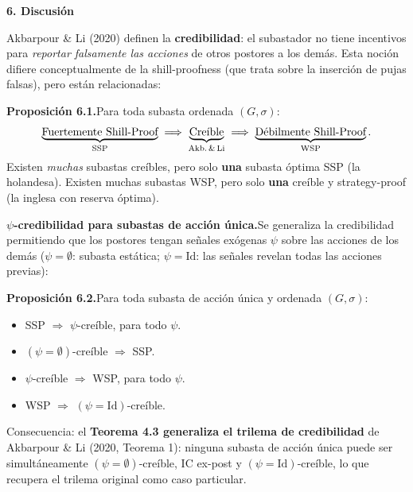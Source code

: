\documentclass[20pt]{extarticle}
\renewcommand{\small}{\fontsize{20}{25}\selectfont}
\renewcommand{\footnotesize}{\fontsize{18}{22}\selectfont}
\newcommand{\stit}[1]{{\fontsize{38}{46}\selectfont\color{ink}\textbf{#1}}}
\begin{document}
\begin{minipage}[t]{35cm}


  \stit{6. Discusión}

  \vspace{6mm}
  {\small\justifying Akbarpour \& Li (2020) definen la \textbf{credibilidad}: el subastador no tiene incentivos para \emph{reportar falsamente las acciones} de otros postores a los demás. Esta noción difiere conceptualmente de la shill-proofness (que trata sobre la inserción de pujas falsas), pero están relacionadas:}

  \vspace{6mm}
  \begin{tcolorbox}[sidebar]
    \footnotesize\textbf{Proposición 6.1.}\enspace Para toda subasta ordenada $(G,\sigma)$:
    \[
      \underbrace{\text{Fuertemente Shill-Proof}}_{\text{SSP}} \;\Longrightarrow\; \underbrace{\text{Creíble}}_{\text{Akb.\,\&\,Li}} \;\Longrightarrow\; \underbrace{\text{Débilmente Shill-Proof}}_{\text{WSP}}.
    \]
    \smallskip Existen \emph{muchas} subastas creíbles, pero solo \textbf{una} subasta óptima SSP (la holandesa). Existen muchas subastas WSP, pero solo \textbf{una} creíble y strategy-proof (la inglesa con reserva óptima).
  \end{tcolorbox}

  \vspace{6mm}
  {\small\justifying\textbf{$\psi$-credibilidad para subastas de acción única.}\enspace Se generaliza la credibilidad permitiendo que los postores tengan señales exógenas $\psi$ sobre las acciones de los demás ($\psi{=}\emptyset$: subasta estática; $\psi{=}\mathrm{Id}$: las señales revelan todas las acciones previas):}

  \vspace{5mm}
  \begin{tcolorbox}[shaded]
    \footnotesize\textbf{Proposición 6.2.}\enspace Para toda subasta de acción única y ordenada $(G,\sigma)$:
    \begin{itemize}
      \item SSP $\Rightarrow$ $\psi$-creíble, para todo $\psi$.
      \item $(\psi{=}\emptyset)$-creíble $\Rightarrow$ SSP.
      \item $\psi$-creíble $\Rightarrow$ WSP, para todo $\psi$.
      \item WSP $\Rightarrow$ $(\psi{=}\mathrm{Id})$-creíble.
    \end{itemize}
    \smallskip Consecuencia: el \textbf{Teorema 4.3 generaliza el trilema de credibilidad} de Akbarpour \& Li (2020, Teorema 1): ninguna subasta de acción única puede ser simultáneamente $(\psi{=}\emptyset)$-creíble, IC ex-post y $(\psi{=}\mathrm{Id})$-creíble, lo que recupera el trilema original como caso particular.
  \end{tcolorbox}


\end{minipage}
\end{document}
